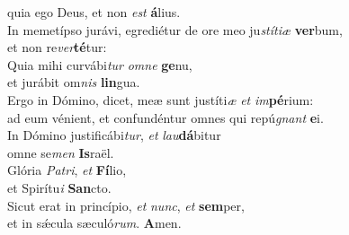 \evenverse quia ego Deus, et non \textit{est} \textbf{á}lius.\\
\oddverse In memetípso jurávi, egrediétur de ore meo ju\textit{stí}\textit{ti}\textit{æ} \textbf{ver}bum,~\*\\
\oddverse et non re\textit{ver}\textbf{té}tur:\\
\evenverse Quia mihi curvábi\textit{tur} \textit{om}\textit{ne} \textbf{ge}nu,~\*\\
\evenverse et jurábit om\textit{nis} \textbf{lin}gua.\\
\oddverse Ergo in Dómino, dicet, meæ sunt justíti\textit{æ} \textit{et} \textit{im}\textbf{pé}rium:~\*\\
\oddverse ad eum vénient, et confundéntur omnes qui repú\textit{gnant} \textbf{e}i.\\
\evenverse In Dómino justificábi\textit{tur}, \textit{et} \textit{lau}\textbf{dá}bitur~\*\\
\evenverse omne se\textit{men} \textbf{Is}raël.\\
\oddverse Glória \textit{Pa}\textit{tri}, \textit{et} \textbf{Fí}lio,~\*\\
\oddverse et Spirítu\textit{i} \textbf{San}cto.\\
\evenverse Sicut erat in princípio, \textit{et} \textit{nunc}, \textit{et} \textbf{sem}per,~\*\\
\evenverse et in sǽcula sæculó\textit{rum}. \textbf{A}men.\\
